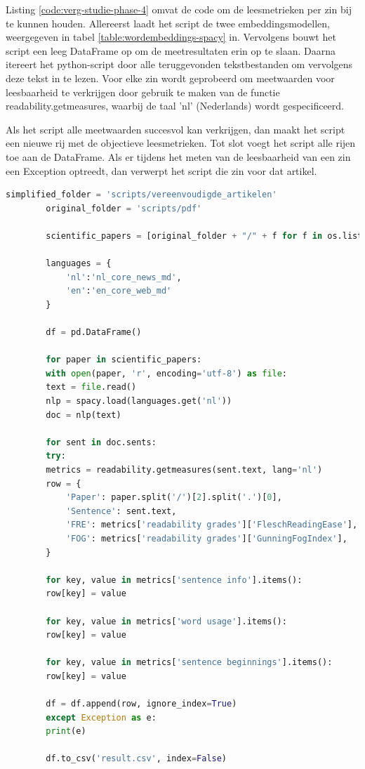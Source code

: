 Listing \ref{code:verg-studie-phase-4} omvat de code om de leesmetrieken per zin bij te kunnen houden. Allereerst laadt het script de twee embeddingsmodellen, weergegeven in tabel \ref{table:wordembeddings-spacy} in. Vervolgens bouwt het script een leeg DataFrame op om de meetresultaten erin op te slaan. Daarna itereert het python-script door alle teruggevonden tekstbestanden om vervolgens deze tekst in te lezen. Voor elke zin wordt geprobeerd om meetwaarden voor leesbaarheid te verkrijgen door gebruik te maken van de functie readability.getmeasures, waarbij de taal 'nl' (Nederlands) wordt gespecificeerd. 

\medspace

Als het script alle meetwaarden succesvol kan verkrijgen, dan maakt het script een nieuwe rij met de objectieve leesmetrieken. Tot slot voegt het script alle rijen toe aan de DataFrame. Als er tijdens het meten van de leesbaarheid van een zin een Exception optreedt, dan verwerpt het script die zin voor dat artikel.

\begin{center}
	\begin{lstlisting}[language=Python, caption={Script voor fase 4 van de vergelijkende studie}, label={code:verg-studie-phase-4}]	
		simplified_folder = 'scripts/vereenvoudigde_artikelen'
		original_folder = 'scripts/pdf'
		
		scientific_papers = [original_folder + "/" + f for f in os.listdir(original_folder)] + [simplified_folder + "/" + f for f in os.listdir(simplified_folder)]
		
		languages = {
			'nl':'nl_core_news_md',
			'en':'en_core_web_md'
		}
		
		df = pd.DataFrame()
		
		for paper in scientific_papers:
		with open(paper, 'r', encoding='utf-8') as file:
		text = file.read()
		nlp = spacy.load(languages.get('nl'))
		doc = nlp(text)
		
		for sent in doc.sents:
		try:
		metrics = readability.getmeasures(sent.text, lang='nl')
		row = {
			'Paper': paper.split('/')[2].split('.')[0],
			'Sentence': sent.text,
			'FRE': metrics['readability grades']['FleschReadingEase'],
			'FOG': metrics['readability grades']['GunningFogIndex'],
		}
		
		for key, value in metrics['sentence info'].items():
		row[key] = value
		
		for key, value in metrics['word usage'].items():
		row[key] = value
		
		for key, value in metrics['sentence beginnings'].items():
		row[key] = value
		
		df = df.append(row, ignore_index=True)
		except Exception as e:
		print(e)
		
		df.to_csv('result.csv', index=False)
	\end{lstlisting}
\end{center}

